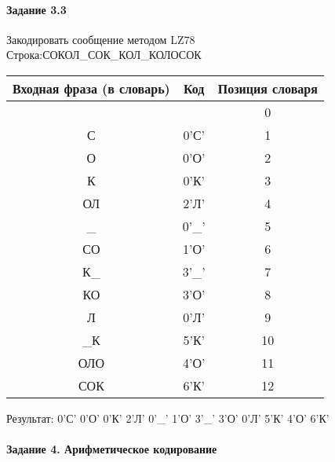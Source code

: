 \documentclass[a4paper, 12pt]{article}
\begin{document}
\paragraph{Задание 3.3}

Закодировать сообщение методом LZ78\\
Строка:СОКОЛ\_СОК\_КОЛ\_КОЛОСОК\\
\begin{table}[h!]
\centering
\begin{tabular}{|c|c|c|} 
\hline
 Входная фраза (в словарь) & Код & Позиция словаря \\ \hline

 &  & 0 \\ \hline
С & 0'С' & 1 \\ \hline
О & 0'О' & 2 \\ \hline
К & 0'К' & 3 \\ \hline
ОЛ & 2'Л' & 4 \\ \hline
\_ & 0'\_' & 5 \\ \hline
СО & 1'О' & 6 \\ \hline
К\_ & 3'\_' & 7 \\ \hline
КО & 3'О' & 8 \\ \hline
Л & 0'Л' & 9 \\ \hline
\_К & 5'К' & 10 \\ \hline
ОЛО & 4'О' & 11 \\ \hline
СОК & 6'К' & 12 \\ \hline
\end{tabular}
\end{table}

Результат: 0'С' 0'О' 0'К' 2'Л' 0'\_' 1'О' 3'\_' 3'О' 0'Л' 5'К' 4'О' 6'К'\\
\pagebreak
\paragraph{Задание 4. Арифметическое кодирование\\}
\end{document}
